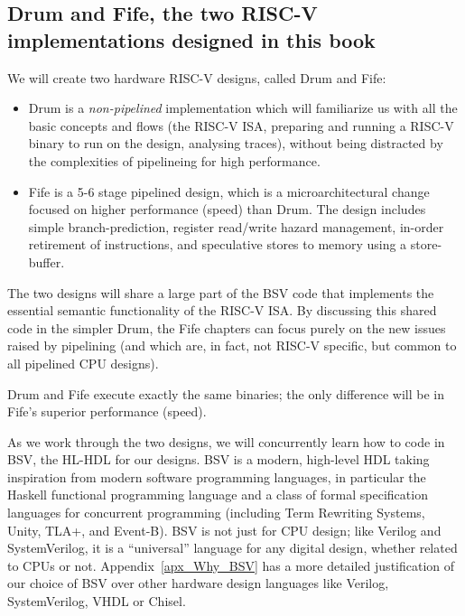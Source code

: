 
\subsection{Drum and Fife, the two RISC-V implementations designed in this book}

We will create two hardware RISC-V designs, called Drum and Fife:

\begin{itemize}

  \item Drum is a \emph{non-pipelined} implementation which will
        familiarize us with all the basic concepts and flows (the
        RISC-V ISA, preparing and running a RISC-V binary to run on
        the design, analysing traces), without being distracted by the
        complexities of pipelineing for high performance.

  \item Fife is a 5-6 stage pipelined design, which is a
        microarchitectural change focused on higher performance
        (speed) than Drum. The design includes simple
        branch-prediction, register read/write hazard management,
        in-order retirement of instructions, and speculative stores to
        memory using a store-buffer.

\end{itemize}

The two designs will share a large part of the BSV code that
implements the essential semantic functionality of the RISC-V ISA.  By
discussing this shared code in the simpler Drum, the Fife chapters can
focus purely on the new issues raised by pipelining (and which are, in
fact, not RISC-V specific, but common to all pipelined CPU designs).

Drum and Fife execute exactly the same binaries; the only difference
will be in Fife's superior performance (speed).

As we work through the two designs, we will concurrently learn how to
code in BSV, the HL-HDL for our designs.  BSV is a modern, high-level
HDL taking inspiration from modern software programming languages, in
particular the Haskell functional programming language and a class of
formal specification languages for concurrent programming (including
Term Rewriting Systems, Unity, TLA+, and Event-B).  BSV is not just
for CPU design; like Verilog and SystemVerilog, it is a ``universal''
language for any digital design, whether related to CPUs or not.
Appendix~\ref{apx_Why_BSV} has a more detailed justification of our
choice of BSV over other hardware design languages like Verilog,
SystemVerilog, VHDL or Chisel.

